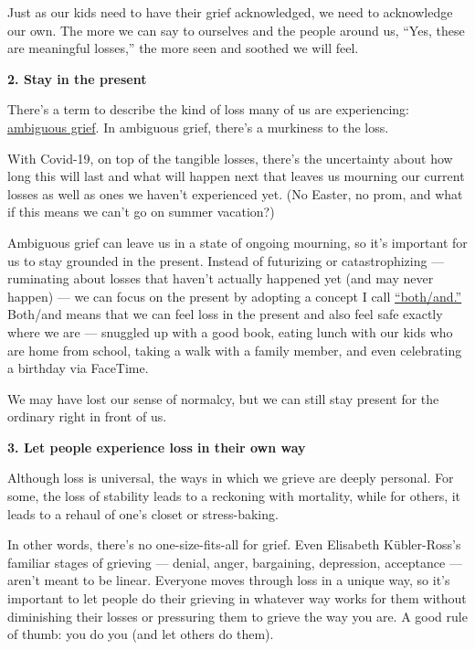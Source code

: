 Just as our kids need to have their grief acknowledged, we need to
acknowledge our own. The more we can say to ourselves and the people
around us, ``Yes, these are meaningful losses,'' the more seen and
soothed we will feel.

\textbf{2. Stay in the present}

There's a term to describe the kind of loss many of us are experiencing:
\href{https://www.researchgate.net/publication/258193450_Ambiguous_Loss_and_the_Family_Grieving_Process}{ambiguous
grief}. In ambiguous grief, there's a murkiness to the loss.

With Covid-19, on top of the tangible losses, there's the uncertainty
about how long this will last and what will happen next that leaves us
mourning our current losses as well as ones we haven't experienced yet.
(No Easter, no prom, and what if this means we can't go on summer
vacation?)

Ambiguous grief can leave us in a state of ongoing mourning, so it's
important for us to stay grounded in the present. Instead of futurizing
or catastrophizing --- ruminating about losses that haven't actually
happened yet (and may never happen) --- we can focus on the present by
adopting a concept I call
\href{https://www.theatlantic.com/family/archive/2020/03/a-therapists-guide-to-emotional-health-in-a-pandemic/608161/}{``both/and.''}
Both/and means that we can feel loss in the present and also feel safe
exactly where we are --- snuggled up with a good book, eating lunch with
our kids who are home from school, taking a walk with a family member,
and even celebrating a birthday via FaceTime.

We may have lost our sense of normalcy, but we can still stay present
for the ordinary right in front of us.

\textbf{3. Let people experience loss in their own way}

Although loss is universal, the ways in which we grieve are deeply
personal. For some, the loss of stability leads to a reckoning with
mortality, while for others, it leads to a rehaul of one's closet or
stress-baking.

In other words, there's no one-size-fits-all for grief. Even Elisabeth
Kübler-Ross's familiar stages of grieving --- denial, anger, bargaining,
depression, acceptance --- aren't meant to be linear. Everyone moves
through loss in a unique way, so it's important to let people do their
grieving in whatever way works for them without diminishing their losses
or pressuring them to grieve the way you are. A good rule of thumb: you
do you (and let others do them).

